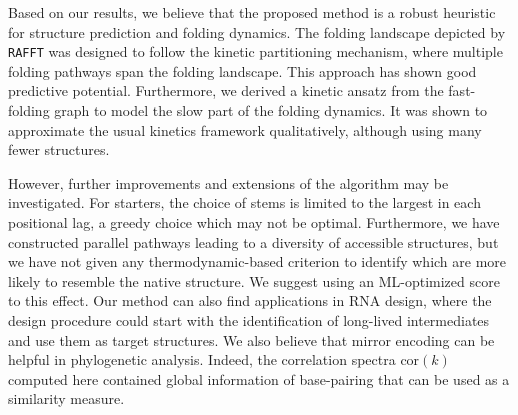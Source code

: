 Based on our results, we believe that the proposed method is a robust heuristic for structure prediction and folding dynamics. The folding landscape depicted by \texttt{RAFFT} was designed to follow the kinetic partitioning mechanism, where multiple folding pathways span the folding landscape. This approach has shown good predictive potential. Furthermore, we derived a kinetic ansatz from the fast-folding graph to model the slow part of the folding dynamics. It was shown to approximate the usual kinetics framework qualitatively, although using many fewer structures. 

However, further improvements and extensions of the algorithm may be investigated. For starters, the choice of stems is limited to the largest in each positional lag, a greedy choice which may not be optimal. Furthermore, we have constructed parallel pathways leading to a diversity of accessible structures, but we have not given any thermodynamic-based criterion to identify which are more likely to resemble the native structure. We suggest using an ML-optimized score to this effect. Our method can also find applications in RNA design, where the design procedure could start with the identification of long-lived intermediates and use them as target structures. We also believe that mirror encoding can be helpful in phylogenetic analysis. Indeed, the correlation spectra \(\text{cor}(k)\) computed here contained global information of base-pairing that can be used as a similarity measure.
